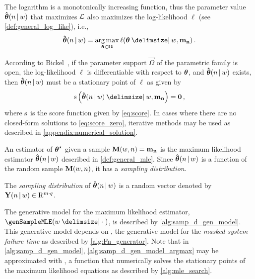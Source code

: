 \documentclass[
    11pt,
    extrafontsizes,
    article,
    oldfontcommands,
    final,
    oneside,
    openany,
    hidelinks]{memoir}
\begin{document}
The logarithm is a monotonically increasing function, thus the parameter value $\boldsymbol{\mathbf{\hat{\boldsymbol{\mathbf{\theta}}}}}(n {\,|\,} w)$ that maximizes $\operatorname{\mathcal{L}}$ also maximizes the log-likelihood $\ell$ (see \cref{def:general_log_like}), i.e.,
\begin{equation}
\label{eq:general_mle}
\mle = \argmax_{\sysparamvec \in \vec\Omega} \ell(\sysparamvec \Given w, \mfso)\,.
\end{equation}

According to Bickel~\cite{bickel}, if the parameter support $\vec\Omega$ of the parametric family is open, the log-likelihood $\ell$ is differentiable with respect to $\boldsymbol{\mathbf{\theta}}$, and $\boldsymbol{\mathbf{\hat{\boldsymbol{\mathbf{\theta}}}}}(n {\,|\,} w)$ exists, then $\boldsymbol{\mathbf{\hat{\boldsymbol{\mathbf{\theta}}}}}(n {\,|\,} w)$ must be a stationary point of $\ell$ as given by
\begin{equation}
\label{eq:score_zero}
\score\left(\mle \Given w, \mfso\right) = \vec{0}\,,
\end{equation}
where $\operatorname{\rm{s}}$ is the score function given by \cref{eq:score}. In cases where there are no closed-form solutions to \cref{eq:score_zero}, iterative methods may be used as described in \cref{appendix:numerical_solution}.

An estimator of ${\boldsymbol{\mathbf{\theta}}}^{\star}$ given a sample $\boldsymbol{\mathbf{M}}(w,n) = \boldsymbol{\mathbf{m_n}}$ is the maximum likelihood estimator $\boldsymbol{\mathbf{\hat{\boldsymbol{\mathbf{\theta}}}}}(n {\,|\,} w)$ described in \cref{def:general_mle}. Since $\boldsymbol{\mathbf{\hat{\boldsymbol{\mathbf{\theta}}}}}(n {\,|\,} w)$ is a function of the random sample $\boldsymbol{\mathbf{M}}(w,n)$, it has a \emph{sampling distribution}.
\begin{definition}
The \emph{sampling distribution} of $\boldsymbol{\mathbf{\hat{\boldsymbol{\mathbf{\theta}}}}}(n {\,|\,} w)$ is a random vector denoted by $\mathrm{\boldsymbol{\mathbf{Y}}}(n {\,|\,} w) \in \mathrm{R}^{m \cdot q}$.
\end{definition}

\sloppy
The generative model for the maximum likelihood estimator, $\genSampleMLE(w \Given \cdot\;)$, is described by \cref{alg:samp_d_gen_model}. This generative model depends on \genSampleFn, the generative model for the \emph{masked system failure time} as described by \cref{alg:Fn_generator}. Note that in \cref{alg:samp_d_gen_model}, \cref{alg:samp_d_gen_model_argmax} may be approximated with \findmle, a function that numerically solves the stationary points of the maximum likelihood equations as described by \cref{alg:mle_search}.
\end{document}
